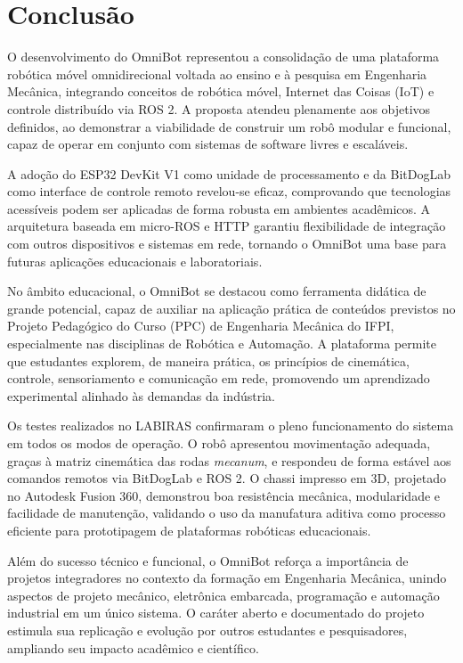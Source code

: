 \chapter{Conclusão}


O desenvolvimento do OmniBot representou a consolidação de uma plataforma robótica móvel omnidirecional voltada ao ensino e à pesquisa em Engenharia Mecânica, integrando conceitos de robótica móvel, Internet das Coisas (IoT) e controle distribuído via ROS 2. A proposta atendeu plenamente aos objetivos definidos, ao demonstrar a viabilidade de construir um robô modular e funcional, capaz de operar em conjunto com sistemas de software livres e escaláveis.

A adoção do ESP32 DevKit V1 como unidade de processamento e da BitDogLab como interface de controle remoto revelou-se eficaz, comprovando que tecnologias acessíveis podem ser aplicadas de forma robusta em ambientes acadêmicos. A arquitetura baseada em micro-ROS e HTTP garantiu flexibilidade de integração com outros dispositivos e sistemas em rede, tornando o OmniBot uma base para futuras aplicações educacionais e laboratoriais.

No âmbito educacional, o OmniBot se destacou como ferramenta didática de grande potencial, capaz de auxiliar na aplicação prática de conteúdos previstos no Projeto Pedagógico do Curso (PPC) de Engenharia Mecânica do IFPI, especialmente nas disciplinas de Robótica e Automação. A plataforma permite que estudantes explorem, de maneira prática, os princípios de cinemática, controle, sensoriamento e comunicação em rede, promovendo um aprendizado experimental alinhado às demandas da indústria.

Os testes realizados no LABIRAS confirmaram o pleno funcionamento do sistema em todos os modos de operação. O robô apresentou movimentação adequada, graças à matriz cinemática das rodas \textit{mecanum}, e respondeu de forma estável aos comandos remotos via BitDogLab e ROS 2. O chassi impresso em 3D, projetado no Autodesk Fusion 360, demonstrou boa resistência mecânica, modularidade e facilidade de manutenção, validando o uso da manufatura aditiva como processo eficiente para prototipagem de plataformas robóticas educacionais.

Além do sucesso técnico e funcional, o OmniBot reforça a importância de projetos integradores no contexto da formação em Engenharia Mecânica, unindo aspectos de projeto mecânico, eletrônica embarcada, programação e automação industrial em um único sistema. O caráter aberto e documentado do projeto estimula sua replicação e evolução por outros estudantes e pesquisadores, ampliando seu impacto acadêmico e científico.